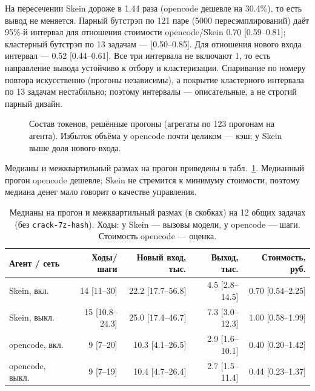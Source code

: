 \documentclass[11pt,a4paper]{article}
\begin{document}
На пересечении Skein дороже в 1.44 раза (opencode дешевле на 30.4\%), то есть вывод не
меняется. Парный бутстрэп по 121 паре (5000 пересэмплирований) даёт 95\%-й интервал для
отношения стоимости opencode/Skein 0.70 [0.59--0.81]; кластерный бутстрэп по 13 задачам ---
[0.50--0.85]. Для отношения нового входа интервал --- 0.52 [0.44--0.61]. Все три интервала не
включают 1, то есть направление вывода устойчиво к отбору и кластеризации. Спаривание по
номеру повтора искусственно (прогоны независимы), а покрытие кластерного интервала по 13
задачам нестабильно; поэтому интервалы --- описательные, а не строгий парный дизайн.

\begin{figure}[t]
\centering
{}
\caption{Состав токенов, решённые прогоны (агрегаты по 123 прогонам на агента). Избыток
объёма у opencode почти целиком --- кэш; у Skein выше доля нового входа.}
\label{fig:tokens}
\end{figure}

Медианы и межквартильный размах на прогон приведены в табл.~\ref{tab:medians}. Медианный
прогон opencode дешевле; Skein не стремится к минимуму стоимости, поэтому медиана денег
мало говорит о качестве управления.

\begin{table}[t]
\centering
\small
\caption{Медианы на прогон и межквартильный размах (в скобках) на 12 общих задачах (без
\texttt{crack-7z-hash}). Ходы: у Skein --- вызовы модели, у opencode --- шаги. Стоимость
opencode --- оценка.}
\label{tab:medians}
\begin{tabular}{@{}lrrrr@{}}
\toprule
Агент / сеть & Ходы/шаги & Новый вход, тыс. & Выход, тыс. & Стоимость, руб. \\
\midrule
Skein, вкл. & 14 [11--30] & 22.2 [17.7--56.8] & 4.5 [2.8--14.5] & 0.70 [0.54--2.25] \\
Skein, выкл. & 15 [10.8--24.3] & 25.0 [17.4--46.7] & 7.3 [3.0--12.3] & 1.00 [0.58--1.99] \\
opencode, вкл. & 9 [7--20] & 10.3 [4.1--26.5] & 2.9 [1.6--10.1] & 0.40 [0.20--1.42] \\
opencode, выкл. & 9 [7--19] & 10.4 [4.7--26.4] & 2.7 [1.5--11.4] & 0.44 [0.23--1.37] \\
\bottomrule
\end{tabular}
\end{table}
\end{document}
